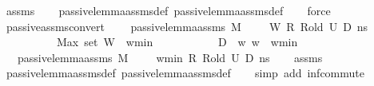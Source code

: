 \begin{isabellebody}
\ assms\isanewline
\ \ \isamarkupfalse%
\ passive{\isacharunderscore}{\kern0pt}lemma{\isacharunderscore}{\kern0pt}assms{\isacharunderscore}{\kern0pt}{}{\isacharunderscore}{\kern0pt}def\ passive{\isacharunderscore}{\kern0pt}lemma{\isacharunderscore}{\kern0pt}assms{\isacharunderscore}{\kern0pt}def\isanewline
\ \ \isamarkupfalse%
\ force%
\endisatagproof
{\isafoldproof}%
%
\isadelimproof
\isanewline
%
\endisadelimproof
\isanewline
{}\isamarkupfalse%
\ passive{\isacharunderscore}{\kern0pt}assms{\isacharunderscore}{\kern0pt}convert{\isacharunderscore}{\kern0pt}{}{\isacharcolon}{\kern0pt}\ \isanewline
\ \ \ {\isachardoublequoteopen}passive{\isacharunderscore}{\kern0pt}lemma{\isacharunderscore}{\kern0pt}assms\ M\ {\isasymLambda}\ {\isasymLambda}{\isacharprime}{\kern0pt}\ {\isasymGamma}\ {\isasymOmega}\ W\ R\ R{\isacharunderscore}{\kern0pt}old\ U{}\ D{}\ ns{\isachardoublequoteclose}\ \ \isanewline
\ \ \ \ \ \ \ \ \ \ {\isachardoublequoteopen}Max\ {\isacharparenleft}{\kern0pt}set\ W{\isacharparenright}{\kern0pt}\ {\isacharless}{\kern0pt}\ w{\isacharunderscore}{\kern0pt}min{\isachardoublequoteclose}\ \isanewline
\ \ \ \ \ \ \ \ \ \ {\isachardoublequoteopen}D{}\ {\isasyminter}\ {\isacharbraceleft}{\kern0pt}w{\isachardot}{\kern0pt}\ w\ {\isasymge}\ w{\isacharunderscore}{\kern0pt}min{\isacharbraceright}{\kern0pt}\ {\isacharequal}{\kern0pt}\ {\isacharbraceleft}{\kern0pt}{\isacharbraceright}{\kern0pt}{\isachardoublequoteclose}\isanewline
\ \ \ {\isachardoublequoteopen}passive{\isacharunderscore}{\kern0pt}lemma{\isacharunderscore}{\kern0pt}assms{\isacharunderscore}{\kern0pt}{}\ M\ {\isasymLambda}\ {\isasymLambda}{\isacharprime}{\kern0pt}\ {\isasymGamma}\ {\isasymOmega}\ w{\isacharunderscore}{\kern0pt}min\ R\ R{\isacharunderscore}{\kern0pt}old\ U{}\ D{}\ ns{\isachardoublequoteclose}\isanewline
%
\isadelimproof
\ \ %
\endisadelimproof
%
\isatagproof
{}\isamarkupfalse%
\ assms\isanewline
\ \ \isamarkupfalse%
\ passive{\isacharunderscore}{\kern0pt}lemma{\isacharunderscore}{\kern0pt}assms{\isacharunderscore}{\kern0pt}{}{\isacharunderscore}{\kern0pt}def\ passive{\isacharunderscore}{\kern0pt}lemma{\isacharunderscore}{\kern0pt}assms{\isacharunderscore}{\kern0pt}def\isanewline
\ \ \isamarkupfalse%
\ {\isacharparenleft}{\kern0pt}simp\ add{\isacharcolon}{\kern0pt}\ inf{\isacharunderscore}{\kern0pt}commute{\isacharparenright}{\kern0pt}%

\end{isabellebody}
